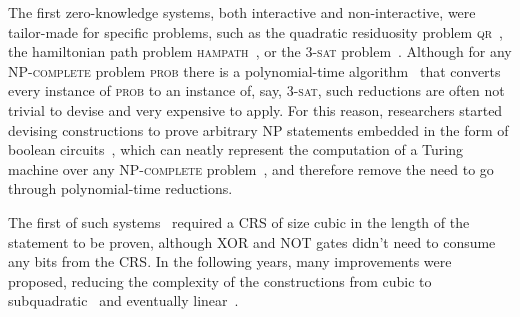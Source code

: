 The first zero-knowledge systems, both interactive and non-interactive, were tailor-made for 
specific problems, such as the quadratic residuosity problem \textsc{qr}~\cite{GoldwasserMR1989}, 
the hamiltonian path problem \textsc{hampath}~\cite{LapidotS1991}, or the \(3\)-\textsc{sat} 
problem~\cite{BlumSMP1991}.
Although for any \textsc{NP-complete} problem \textsc{prob} there is a polynomial-time 
algorithm~\cite{Karp1972} that converts every instance of \textsc{prob} to an instance 
of, say, \(3\)-\textsc{sat}, such reductions are often not trivial to devise and very expensive 
to apply.
For this reason, researchers started devising constructions to prove arbitrary NP statements 
embedded in the form of boolean circuits~\cite{Damgard1993}, which can neatly represent the 
computation of a Turing machine over any \textsc{NP-complete} problem~\cite{Cook1971}, and 
therefore remove the need to go through polynomial-time reductions.

The first of such systems~\cite{Damgard1993} required a CRS of size cubic in the length of the 
statement to be proven, although XOR and NOT gates didn't need to consume any bits from the CRS\@.
In the following years, many improvements were proposed, reducing the complexity of the 
constructions from cubic to subquadratic~\cite{BoyarBP1995} and eventually 
linear~\cite{CramerD1997}.
